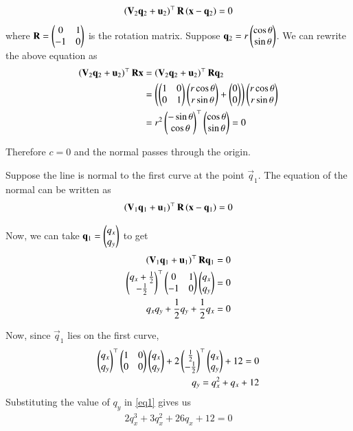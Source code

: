 \documentclass[journal]{IEEEtran}
\begin{document}
\begin{align}
    \left(\mathbf{V}_2\mathbf{q}_2 + \mathbf{u}_2\right)^\top\mathbf{R}\left(\mathbf{x} - \mathbf{q}_2\right) = 0 \\
\end{align}
where $\mathbf{R} = \begin{pmatrix}0 & 1 \\ -1 & 0\end{pmatrix}$ is the rotation matrix. Suppose $\mathbf{q}_2 = r\begin{pmatrix}\cos\theta \\ \sin\theta\end{pmatrix}$.
We can rewrite the above equation as
\begin{align}
    \left(\mathbf{V}_2\mathbf{q}_2 + \mathbf{u}_2\right)^\top\mathbf{R}\mathbf{x} &= \left(\mathbf{V}_2\mathbf{q}_2 + \mathbf{u}_2\right)^\top\mathbf{R}\mathbf{q}_2  \\
    &= \left(\begin{pmatrix}1 & 0 \\ 0 & 1\end{pmatrix}\begin{pmatrix}r\cos\theta \\ r\sin\theta\end{pmatrix} + \begin{pmatrix}0 \\ 0\end{pmatrix}\right)\begin{pmatrix}r\cos\theta \\ r\sin\theta\end{pmatrix} \\
    &= r^2\begin{pmatrix}-\sin\theta \\ \cos\theta\end{pmatrix}^\top\begin{pmatrix}\cos\theta \\ \sin\theta\end{pmatrix} = 0
\end{align}

Therefore $c = 0$ and the normal passes through the origin.

Suppose the line is normal to the first curve at the point $\vec{q}_1$.
The equation of the normal can be written as
\begin{align}
    \left(\mathbf{V}_1\mathbf{q}_1 + \mathbf{u}_1\right)^\top\mathbf{R}\left(\mathbf{x} - \mathbf{q}_1\right) = 0
\end{align}

Now, we can take $\mathbf{q}_1 = \begin{pmatrix}q_x \\ q_y\end{pmatrix}$ to get
\begin{align}
    \left(\mathbf{V}_1\mathbf{q}_1 + \mathbf{u}_1\right)^\top\mathbf{R}\mathbf{q}_1 = 0 \\
    \begin{pmatrix}q_x + \frac{1}{2} \\ -\frac{1}{2}\end{pmatrix}^\top \begin{pmatrix}0 & 1 \\ -1 & 0\end{pmatrix} \begin{pmatrix}q_x \\ q_y\end{pmatrix} = 0 \\
    q_xq_y + \frac{1}{2}q_y + \frac{1}{2}q_x = 0 \label{eq1}
\end{align}

Now, since $\vec{q}_1$ lies on the first curve,
\begin{align}
    \begin{pmatrix}q_x \\ q_y\end{pmatrix}^\top \begin{pmatrix}1 & 0 \\ 0 & 0\end{pmatrix} \begin{pmatrix}q_x \\ q_y\end{pmatrix} + 2\begin{pmatrix}\frac{1}{2} \\ -\frac{1}{2}\end{pmatrix}^\top\begin{pmatrix}q_x \\ q_y\end{pmatrix} + 12 = 0 \\
    q_y = q_x^2 + q_x + 12
\end{align} 
Substituting the value of $q_y$ in \ref{eq1} gives us
\begin{align}
   2q_x^3 + 3q_x^2 + 26q_x + 12 = 0 \\
\end{align}
\end{document}
